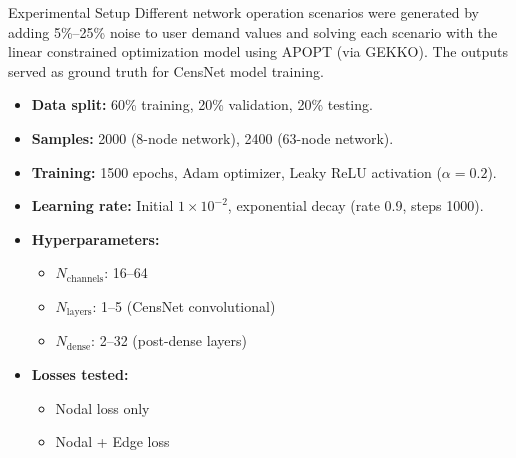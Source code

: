 \documentclass[hyperref={colorlinks,citecolor=blue,linkcolor=blue,urlcolor=blue}]{beamer}
\begin{document}
\begin{frame}{Experimental Setup}
\footnotesize
Different network operation scenarios were generated by adding 5\%--25\% noise to user demand values 
and solving each scenario with the linear constrained optimization model using APOPT (via GEKKO). 
The outputs served as ground truth for CensNet model training.

\begin{itemize}
    \item \textbf{Data split:} 60\% training, 20\% validation, 20\% testing.
    \item \textbf{Samples:} 2000 (8-node network), 2400 (63-node network).
    \item \textbf{Training:} 1500 epochs, Adam optimizer, Leaky ReLU activation ($\alpha = 0.2$).
    \item \textbf{Learning rate:} Initial $1\times 10^{-2}$, exponential decay (rate 0.9, steps 1000).
    \item \textbf{Hyperparameters:} 
        \begin{itemize}
            \item $N_{\text{channels}}$: 16–64
            \item $N_{\text{layers}}$: 1–5 (CensNet convolutional)
            \item $N_{\text{dense}}$: 2–32 (post-dense layers)
        \end{itemize}
    \item \textbf{Losses tested:} 
        \begin{itemize}
            \item Nodal loss only
            \item Nodal + Edge loss
        \end{itemize}
\end{itemize}
\end{frame}
%
%
\end{document}
